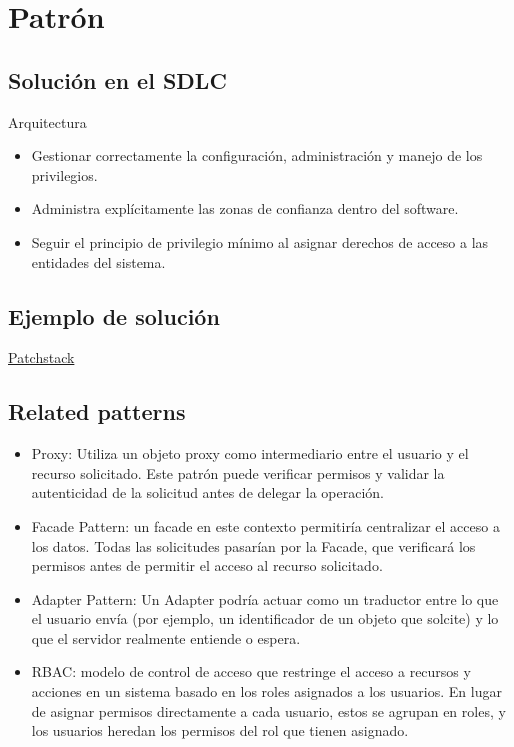 \section{Patrón}
\subsection{Solución en el SDLC}
Arquitectura
\begin{itemize}
    \item Gestionar correctamente la configuración, administración y manejo de los privilegios.
    \item Administra explícitamente las zonas de confianza dentro del software.
    \item Seguir el principio de privilegio mínimo al asignar derechos de acceso a las entidades del sistema.
\end{itemize}
\subsection{Ejemplo de solución}
\href{https://patchstack.com/academy/wordpress/securing-code/privilege-escalation/}{Patchstack}
\subsection{Related patterns}

\begin{itemize}
    \item Proxy: Utiliza un objeto proxy como intermediario entre el usuario y el recurso solicitado.
Este patrón puede verificar permisos y validar la autenticidad de la solicitud antes de
delegar la operación.
    \item Facade Pattern: un facade en este contexto permitiría centralizar el acceso a los datos.
    Todas las solicitudes pasarían por la Facade, que verificará los permisos antes de permitir
    el acceso al recurso solicitado.
    \item Adapter Pattern: Un Adapter podría actuar como un traductor entre lo que el usuario
    envía (por ejemplo, un identificador de un objeto que solcite) y lo que el servidor
    realmente entiende o espera.
    \item RBAC: modelo de control de acceso que restringe el acceso a recursos y acciones en un
    sistema basado en los roles asignados a los usuarios. En lugar de asignar permisos directamente a cada usuario, estos se agrupan en roles, y los usuarios heredan los permisos
    del rol que tienen asignado.
\end{itemize}




